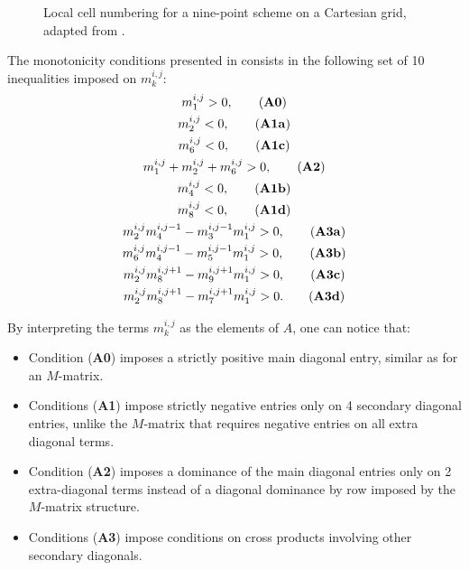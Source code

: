 \documentclass[final,11pt]{elsarticle}
\newcounter{bla}
\begin{document}
\begin{figure}[ht!]
    \centering
    \caption{Local cell numbering for a nine-point scheme on a Cartesian grid, adapted from \cite{nordbotten2007}.}
    \label{fig_m}
\end{figure}
The monotonicity conditions presented in \cite{nordbotten2007} consists in the following set of 10 inequalities imposed on $m_{k}^{i,j}$:
\begin{gather}
m_1^{i,j}>0, \tag{\textbf{A0}}\\
m_2^{i,j}<0,\tag{\textbf{A1a}}\\
m_{6}^{i,j}<0,\tag{\textbf{A1c}}\\
m_1^{i,j}+m_2^{i,j}+m_6^{i,j}>0,\tag{\textbf{A2}}\\
m_{4}^{i,j}<0,\tag{\textbf{A1b}}\\
m_8^{i,j}<0,\tag{\textbf{A1d}}\\
m_2^{i,j}m_4^{i,j-1}-m_3^{i,j-1}m_1^{i,j}>0,\tag{\textbf{A3a}}\\
m_6^{i,j}m_4^{i,j-1}-m_5^{i,j-1}m_1^{i,j}>0,\tag{\textbf{A3b}}\\
m_2^{i,j}m_8^{i,j+1}-m_9^{i,j+1}m_1^{i,j}>0,\tag{\textbf{A3c}}\\
m_2^{i,j}m_8^{i,j+1}-m_7^{i,j+1}m_1^{i,j}>0.\tag{\textbf{A3d}}
\end{gather}

By interpreting the terms $m_k^{i,j}$ as the elements of $A$, one can notice that:
\begin{itemize}
    \item Condition (\textbf{A0}) imposes a strictly positive main diagonal entry, similar as for an $M$-matrix.
    \item Conditions (\textbf{A1}) impose strictly negative entries only on 4 secondary diagonal entries, unlike the $M$-matrix that requires negative entries on all extra diagonal terms.
    \item Condition (\textbf{A2}) imposes a dominance of the main diagonal entries only on 2 extra-diagonal terms instead of a diagonal dominance by row imposed by the $M$-matrix structure.
    \item Conditions (\textbf{A3}) impose conditions on cross products involving other secondary diagonals.
\end{itemize}
\end{document}
